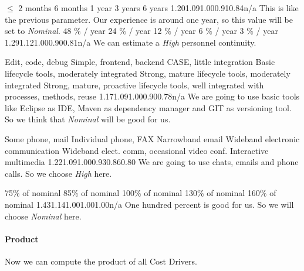 { $ \leq $ 2 months } { 6 months } {1 year } {3 years} {6 years} { }
{1.20}{1.09}{1.00}{0.91}{0.84}{n/a} { 
    This is like the previous parameter. Our experience is around one year,
    so this value will be set to \emph{Nominal}.
}
\pagebreak
{}
{48 \% / year} { 24 \% / year} { 12 \% / year} { 6 \% / year} { 3 \% / year} { }
{1.29}{1.12}{1.00}{0.90}{0.81}{n/a} { 
    We can estimate a \emph{High} personnel continuity.
}

{Edit, code, debug}
{Simple, frontend, backend CASE, little integration}
{Basic lifecycle tools, moderately integrated}
{Strong, mature lifecycle tools, moderately integrated}
{Strong, mature, proactive lifecycle tools, well integrated with processes, methods, reuse}
{ }
{1.17}{1.09}{1.00}{0.90}{0.78}{n/a} { 
    We are going to use basic tools like Eclipse as IDE, Maven as dependency manager
    and GIT as versioning tool. So we think that \emph{Nominal} will be good for us.
}

\pagebreak
{}
{Some phone, mail}
{Individual phone, FAX}
{Narrowband email}
{Wideband electronic communication}
{Wideband elect. comm, occasional video conf.}
{Interactive multimedia}
{1.22}{1.09}{1.00}{0.93}{0.86}{0.80} { 
    We are going to use chats, emails and phone calls.
    So we choose \emph{High} here.
}

{75\% of nominal}
{85\% of nominal}
{100\% of nominal}
{130\% of nominal}
{160\% of nominal}
{}
{1.43}{1.14}{1.00}{1.00}{1.00}{n/a} { 
    One hundred percent is good for us. So we will choose \emph{Nominal} here.
}

\pagebreak

\paragraph{Product} 
Now we can compute the product of all Cost Drivers.

